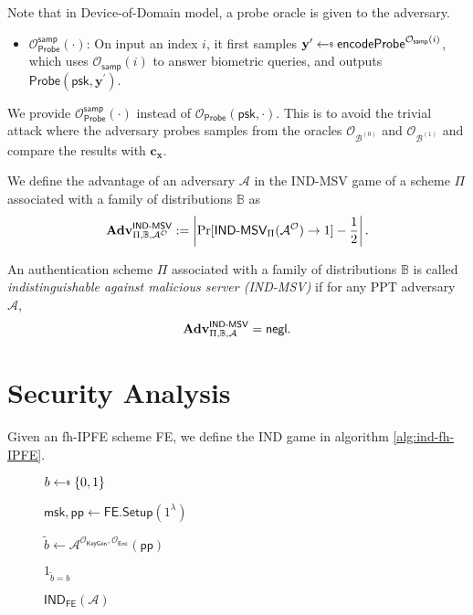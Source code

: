 Note that in Device-of-Domain model, a probe oracle is given to the adversary.

\begin{itemize}

	\item $\mathcal{O}_{\textsf{Probe}}^{\textsf{samp}}(\cdot)$: On input an index $i$, it first samples $\mathbf{y}^\prime \getsdollar \textsf{encodeProbe}^{\mathcal{O}_{\textsf{samp}}(i)}$, which uses $\mathcal{O}_{\textsf{samp}}(i)$ to answer biometric queries, and outputs $\textsf{Probe}(\textsf{psk}, \mathbf{y}^\prime )$. 

\end{itemize}

We provide $\mathcal{O}_{\textsf{Probe}}^{\textsf{samp}}(\cdot)$ instead of $\mathcal{O}_{\textsf{Probe}}(\textsf{psk}, \cdot)$. This is to avoid the trivial attack where the adversary probes samples from the oracles $\mathcal{O}_{\mathcal{B}^{(0)}}$ and $\mathcal{O}_{\mathcal{B}^{(1)}}$ and compare the results with $\mathbf{c_x}$.

We define the advantage of an adversary $\mathcal{A}$ in the \textsf{IND-MSV} game of a scheme $\Pi$ associated with a family of distributions $\mathbb{B}$ as
\[
	\mathbf{Adv}^{\textsf{IND-MSV}}_{\Pi, \mathbb{B}, \mathcal{A}^\mathcal{O}} := \left |\Pr[\textsf{IND-MSV}_{\Pi}(\mathcal{A}^\mathcal{O}) \to 1] - \frac{1}{2} \right|.
\]

An authentication scheme $\Pi$ associated with a family of distributions $\mathbb{B}$ is called \emph{indistinguishable against malicious server (IND-MSV)} if for any PPT adversary $\mathcal{A}$,
\[
	\mathbf{Adv}^{\textsf{IND-MSV}}_{\Pi, \mathbb{B}, \mathcal{A}} = \mathsf{negl}.
\]



\section{Security Analysis}

Given an fh-IPFE scheme \textsf{FE}, we define the \textsf{IND} game in algorithm \ref{alg:ind-fh-IPFE}.

\begin{figure}[h]
\centering

	\begin{minipage}[t]{0.4\textwidth}
	\begin{algorithm}[H]
	\caption{$\textsf{IND}_{\textsf{FE}}(\mathcal{A})$}
	\label{alg:ind-fh-IPFE}
	\begin{algorithmic}[1]
		\State $b \getsdollar \{0, 1\}$

		\State $\textsf{msk}, \textsf{pp} \gets \textsf{FE.Setup}(1^\lambda)$

		\State $\tilde{b} \gets \mathcal{A}^{\mathcal{O}_{\textsf{KeyGen}}, \mathcal{O}_{\textsf{Enc}}} ( \textsf{pp} )$

		\State \Return $1_{\tilde{b} = b}$
	\end{algorithmic}
	\end{algorithm}
	\end{minipage}

\label{fig:ind-fh-IPFE}
\end{figure}

